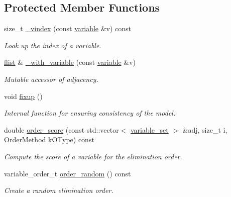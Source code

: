 \subsection*{Protected Member Functions}
\begin{DoxyCompactItemize}
\item 
size\+\_\+t \hyperlink{classmerlin_1_1graphical__model_a643284acb0bff3c9b6d0aed42e06ee0e}{\+\_\+vindex} (const \hyperlink{classmerlin_1_1variable}{variable} \&v) const 
\begin{DoxyCompactList}\small\item\em Look up the index of a variable. \end{DoxyCompactList}\item 
\hyperlink{classmerlin_1_1graphical__model_a615e25ec6594615fddfd4c3c4776b99f}{flist} \& \hyperlink{classmerlin_1_1graphical__model_afe30032fede9c900ded128a6e95b33fb}{\+\_\+with\+\_\+variable} (const \hyperlink{classmerlin_1_1variable}{variable} \&v)
\begin{DoxyCompactList}\small\item\em Mutable accessor of adjacency. \end{DoxyCompactList}\item 
void \hyperlink{classmerlin_1_1graphical__model_a072ca3f28708cb4bab36db5b638ce861}{fixup} ()\hypertarget{classmerlin_1_1graphical__model_a072ca3f28708cb4bab36db5b638ce861}{}\label{classmerlin_1_1graphical__model_a072ca3f28708cb4bab36db5b638ce861}

\begin{DoxyCompactList}\small\item\em Internal function for ensuring consistency of the model. \end{DoxyCompactList}\item 
double \hyperlink{classmerlin_1_1graphical__model_a4bc13ae4aa3bdba76bf398bfe07308ca}{order\+\_\+score} (const std\+::vector$<$ \hyperlink{classmerlin_1_1variable__set}{variable\+\_\+set} $>$ \&adj, size\+\_\+t i, Order\+Method k\+O\+Type) const 
\begin{DoxyCompactList}\small\item\em Compute the score of a variable for the elimination order. \end{DoxyCompactList}\item 
variable\+\_\+order\+\_\+t \hyperlink{classmerlin_1_1graphical__model_aae2a2d690804361f0edc4ca1147dcf39}{order\+\_\+random} () const \hypertarget{classmerlin_1_1graphical__model_aae2a2d690804361f0edc4ca1147dcf39}{}\label{classmerlin_1_1graphical__model_aae2a2d690804361f0edc4ca1147dcf39}

\begin{DoxyCompactList}\small\item\em Create a random elimination order. \end{DoxyCompactList}\end{DoxyCompactItemize}
